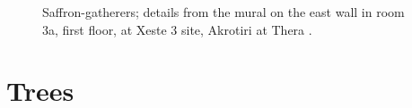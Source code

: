 \begin{figure}[!hbt]
    \centering
    \hfill
    \caption[Saffron-gatherers]{Saffron-gatherers; details from the mural on the east wall in room 3a, first floor, at Xeste 3 site, Akrotiri at Thera \autocite[152]{doumas_wall-paintings_1992}.}
    \label{fig:saffron2}
\end{figure}

\blindtext

\section{Trees}

